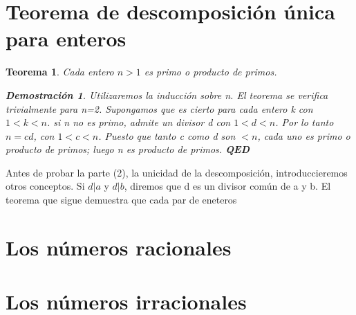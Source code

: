 \documentclass{book}
\newcounter{Teorema}
\numberwithin{equation}{section}
\theoremstyle{plain}  %
\newtheorem{thm}{Teorema}[section]
\newtheorem*{Dem}{Demostración}
\begin{document}
    \section{Teorema de descomposición única para enteros}
    \begin{thm}
        Cada entero $n>1$ es primo o producto de primos. 
        \begin{Dem}
            Utilizaremos la inducción sobre n. El teorema se verifica trivialmente para n=2. Supongamos
            que es cierto para cada entero k con $1<k<n$. si n no es primo, admite un divisor d con $1<d<n$. 
            Por lo tanto $n=cd$, con $1<c<n$. Puesto que tanto c como d son $<n$, cada uno es primo o producto de 
            primos; luego n es producto de primos. \textbf{QED}
        \end{Dem}
    \end{thm}
    Antes de probar la parte (2), la unicidad de la descomposición, introduccieremos otros conceptos. 
    Si $d|a$ y $d|b$, diremos que d es un divisor común de a y b. El teorema que sigue demuestra 
    que cada par de eneteros 
    \section{Los números racionales}
    \section{Los números irracionales}    
\end{document}
